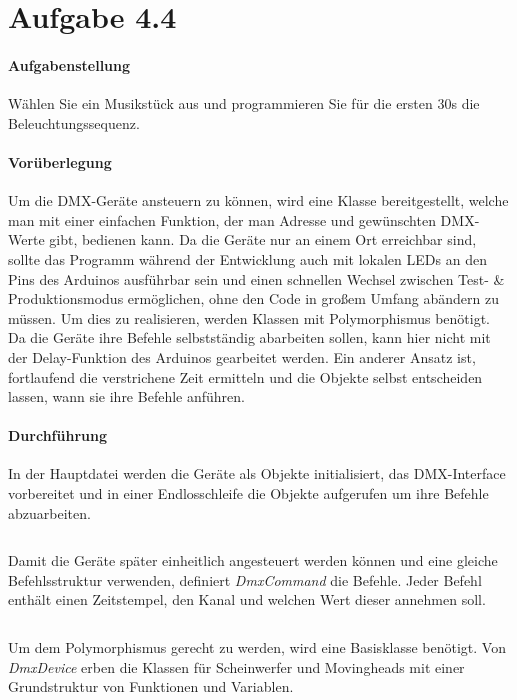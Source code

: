\section{Aufgabe 4.4}
\paragraph{Aufgabenstellung}
Wählen Sie ein Musikstück aus und programmieren Sie für die ersten 30s die Beleuchtungssequenz.

\paragraph{Vorüberlegung}
Um die DMX-Geräte ansteuern zu können, wird eine Klasse bereitgestellt, welche man mit einer einfachen Funktion, der man Adresse und gewünschten DMX-Werte gibt, bedienen kann. Da die Geräte nur an einem Ort erreichbar sind, sollte das Programm während der Entwicklung auch mit lokalen LEDs an den Pins des Arduinos ausführbar sein und einen schnellen Wechsel zwischen Test- \& Produktionsmodus ermöglichen, ohne den Code in großem Umfang abändern zu müssen. Um dies zu realisieren, werden Klassen mit Polymorphismus benötigt. Da die Geräte ihre Befehle selbstständig abarbeiten sollen, kann hier nicht mit der Delay-Funktion des Arduinos gearbeitet werden. Ein anderer Ansatz ist, fortlaufend die verstrichene Zeit ermitteln und die Objekte selbst entscheiden lassen, wann sie ihre Befehle anführen.

\paragraph{Durchführung}
In der Hauptdatei werden die Geräte als Objekte initialisiert, das DMX-Interface vorbereitet und in einer Endlosschleife die Objekte aufgerufen um ihre Befehle abzuarbeiten.
\inputminted[linenos=true, breaklines, fontsize=\fontsize{10pt}{10pt}]{cpp}{../src/main.cpp}

Damit die Geräte später einheitlich angesteuert werden können und eine gleiche Befehlsstruktur verwenden, definiert \textit{DmxCommand} die Befehle. Jeder Befehl enthält einen Zeitstempel, den Kanal und welchen Wert dieser annehmen soll.
\inputminted[linenos=true, breaklines, fontsize=\fontsize{10pt}{10pt}]{cpp}{../src/DmxCommand.h}

Um dem Polymorphismus gerecht zu werden, wird eine Basisklasse benötigt. Von \textit{DmxDevice} erben die Klassen für Scheinwerfer und Movingheads mit einer Grundstruktur von Funktionen und Variablen.
\inputminted[linenos=true, breaklines, fontsize=\fontsize{10pt}{10pt}]{cpp}{../src/DmxDevice.h}

